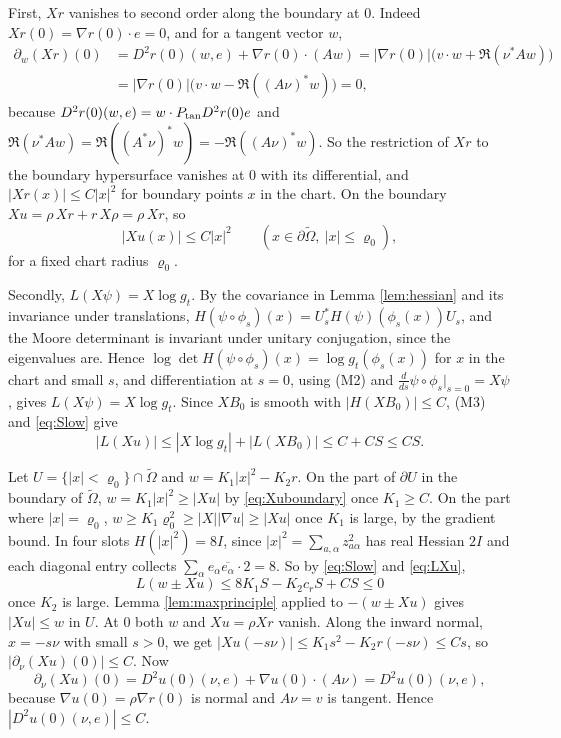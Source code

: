 First, $Xr$ vanishes to second order along the boundary at $0$. Indeed $Xr(0)=\nabla r(0)\cdot e=0$, and
for a tangent vector $w$,
\begin{align*}
\partial_w(Xr)(0)&=D^2r(0)(w,e)+\nabla r(0)\cdot(Aw)
=|\nabla r(0)|\bigl(v\cdot w+\Re(\nu^*Aw)\bigr)\\
&=|\nabla r(0)|\bigl(v\cdot w-\Re((A\nu)^*w)\bigr)=0,
\end{align*}
because $D^2r(0)(w,e)=w\cdot P_{\rm tan}D^2r(0)e$ and $\Re(\nu^*Aw)=\Re((A^*\nu)^*w)=-\Re((A\nu)^*w)$.
So the restriction of $Xr$ to the boundary hypersurface vanishes at $0$ with its differential, and
$|Xr(x)|\le C|x|^2$ for boundary points $x$ in the chart. On the boundary $Xu=\rho\,Xr+r\,X\rho=\rho\,Xr$,
so
\begin{equation}\label{eq:Xuboundary}
|Xu(x)|\le C|x|^2\qquad(x\in\partial\tilde\Omega,\ |x|\le\varrho_0),
\end{equation}
for a fixed chart radius $\varrho_0$.

Secondly, $L(X\psi)=X\log g_t$. By the covariance in Lemma \ref{lem:hessian} and its invariance under
translations, $H(\psi\circ\phi_s)(x)=U_s^*H(\psi)(\phi_s(x))U_s$, and the Moore determinant is invariant
under unitary conjugation, since the eigenvalues are. Hence
$\log\det H(\psi\circ\phi_s)(x)=\log g_t(\phi_s(x))$ for $x$ in the chart and small $s$, and
differentiation at $s=0$, using (M2) and $\frac d{ds}\psi\circ\phi_s|_{s=0}=X\psi$, gives
$L(X\psi)=X\log g_t$. Since $X B_0$ is smooth with $|H(XB_0)|\le C$, (M3) and \eqref{eq:Slow} give
\begin{equation}\label{eq:LXu}
|L(Xu)|\le|X\log g_t|+|L(XB_0)|\le C+CS\le CS .
\end{equation}

Let $U=\{|x|<\varrho_0\}\cap\tilde\Omega$ and $w=K_1|x|^2-K_2r$. On the part of $\partial U$ in the
boundary of $\tilde\Omega$, $w=K_1|x|^2\ge|Xu|$ by \eqref{eq:Xuboundary} once $K_1\ge C$. On the part
where $|x|=\varrho_0$, $w\ge K_1\varrho_0^2\ge|X||\nabla u|\ge|Xu|$ once $K_1$ is large, by the gradient
bound. In four slots $H(|x|^2)=8I$, since $|x|^2=\sum_{a,\alpha}z_{a\alpha}^2$ has real Hessian $2I$ and
each diagonal entry collects $\sum_\alpha e_\alpha\overline{e_\alpha}\cdot2=8$. So by \eqref{eq:Slow} and
\eqref{eq:LXu},
\[
L(w\pm Xu)\le8K_1S-K_2c_rS+CS\le0
\]
once $K_2$ is large. Lemma \ref{lem:maxprinciple} applied to $-(w\pm Xu)$ gives $|Xu|\le w$ in $U$.
At $0$ both $w$ and $Xu=\rho Xr$ vanish. Along the inward normal, $x=-s\nu$ with small $s>0$, we get
$|Xu(-s\nu)|\le K_1s^2-K_2r(-s\nu)\le Cs$, so $|\partial_\nu(Xu)(0)|\le C$. Now
\[
\partial_\nu(Xu)(0)=D^2u(0)(\nu,e)+\nabla u(0)\cdot(A\nu)=D^2u(0)(\nu,e),
\]
because $\nabla u(0)=\rho\nabla r(0)$ is normal and $A\nu=v$ is tangent. Hence $|D^2u(0)(\nu,e)|\le C$.

